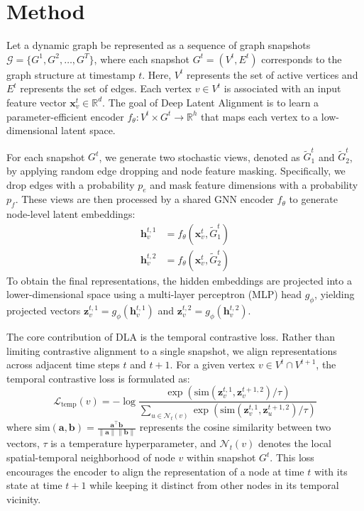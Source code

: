 \section{Method}
Let a dynamic graph be represented as a sequence of graph snapshots $\mathcal{G} = \{G^1, G^2, \dots, G^T\}$, where each snapshot $G^t = (V^t, E^t)$ corresponds to the graph structure at timestamp $t$. Here, $V^t$ represents the set of active vertices and $E^t$ represents the set of edges. Each vertex $v \in V^t$ is associated with an input feature vector $\mathbf{x}_v^t \in \mathbb{R}^d$. The goal of Deep Latent Alignment is to learn a parameter-efficient encoder $f_\theta: V^t \times G^t \to \mathbb{R}^h$ that maps each vertex to a low-dimensional latent space.

For each snapshot $G^t$, we generate two stochastic views, denoted as $\tilde{G}_1^t$ and $\tilde{G}_2^t$, by applying random edge dropping and node feature masking. Specifically, we drop edges with a probability $p_e$ and mask feature dimensions with a probability $p_f$. These views are then processed by a shared GNN encoder $f_\theta$ to generate node-level latent embeddings:
\begin{align}
  \mathbf{h}_v^{t,1} &= f_\theta(\mathbf{x}_v^t, \tilde{G}_1^t) \\
  \mathbf{h}_v^{t,2} &= f_\theta(\mathbf{x}_v^t, \tilde{G}_2^t)
\end{align}
To obtain the final representations, the hidden embeddings are projected into a lower-dimensional space using a multi-layer perceptron (MLP) head $g_\phi$, yielding projected vectors $\mathbf{z}_v^{t,1} = g_\phi(\mathbf{h}_v^{t,1})$ and $\mathbf{z}_v^{t,2} = g_\phi(\mathbf{h}_v^{t,2})$.

The core contribution of DLA is the temporal contrastive loss. Rather than limiting contrastive alignment to a single snapshot, we align representations across adjacent time steps $t$ and $t+1$. For a given vertex $v \in V^t \cap V^{t+1}$, the temporal contrastive loss is formulated as:
\begin{equation}
  \mathcal{L}_{\text{temp}}(v) = -\log \frac{\exp(\text{sim}(\mathbf{z}_v^{t,1}, \mathbf{z}_v^{t+1,2}) / \tau)}{\sum_{u \in \mathcal{N}_t(v)} \exp(\text{sim}(\mathbf{z}_v^{t,1}, \mathbf{z}_u^{t+1,2}) / \tau)}
  \label{eq:infonce}
\end{equation}
where $\text{sim}(\mathbf{a}, \mathbf{b}) = \frac{\mathbf{a}^\top \mathbf{b}}{\|\mathbf{a}\| \|\mathbf{b}\|}$ represents the cosine similarity between two vectors, $\tau$ is a temperature hyperparameter, and $\mathcal{N}_t(v)$ denotes the local spatial-temporal neighborhood of node $v$ within snapshot $G^t$. This loss encourages the encoder to align the representation of a node at time $t$ with its state at time $t+1$ while keeping it distinct from other nodes in its temporal vicinity.

